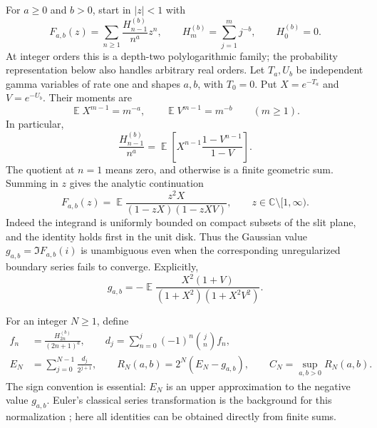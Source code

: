 \documentclass[11pt]{article}
\numberwithin{equation}{section}
\theoremstyle{definition}
\theoremstyle{remark}
\DeclareMathOperator{\E}{\mathbb E}
\begin{document}
For $a\geq0$ and $b>0$, start in $|z|<1$ with
\begin{equation}\label{eq:polylog-definition}
 F_{a,b}(z)=\sum_{n\geq1}\frac{H_{n-1}^{(b)}}{n^a}z^n,
 \qquad H_m^{(b)}=\sum_{j=1}^m j^{-b},\qquad H_0^{(b)}=0.
\end{equation}
At integer orders this is a depth-two polylogarithmic family; the
probability representation below also handles arbitrary real orders.
Let $T_a,U_b$ be independent gamma variables of rate one and shapes
$a,b$, with $T_0=0$. Put $X=e^{-T_a}$ and $V=e^{-U_b}$. Their moments are
\[
 \E X^{m-1}=m^{-a},\qquad \E V^{m-1}=m^{-b}\qquad(m\geq1).
\]
In particular,
\begin{equation}\label{eq:moment-law}
 \frac{H_{n-1}^{(b)}}{n^a}
    =\E\left[X^{n-1}\frac{1-V^{n-1}}{1-V}\right].
\end{equation}
The quotient at $n=1$ means zero, and otherwise is a finite geometric
sum. Summing in $z$ gives the analytic continuation
\begin{equation}\label{eq:polylog-continuation}
 F_{a,b}(z)=\E\frac{z^2X}{(1-zX)(1-zXV)},
 \qquad z\in\mathbb C\setminus[1,\infty).
\end{equation}
Indeed the integrand is uniformly bounded on compact subsets of the
slit plane, and the identity holds first in the unit disk. Thus the
Gaussian value $g_{a,b}=\Im F_{a,b}(i)$ is unambiguous even when the
corresponding unregularized boundary series fails to converge. Explicitly,
\begin{equation}\label{eq:gaussian-value}
 g_{a,b}=-\E\frac{X^2(1+V)}{(1+X^2)(1+X^2V^2)}.
\end{equation}

For an integer $N\geq1$, define
\begin{align}
 f_n&=\frac{H_{2n}^{(b)}}{(2n+1)^a},\qquad
 d_j=\sum_{n=0}^j(-1)^n\binom jn f_n,
 \label{eq:euler-differences}\\
 E_N&=\sum_{j=0}^{N-1}\frac{d_j}{2^{j+1}},\qquad
 R_N(a,b)=2^N(E_N-g_{a,b}),\qquad
 C_N=\sup_{a,b>0}R_N(a,b).
 \label{eq:euler-normalization}
\end{align}
The sign convention is essential: $E_N$ is an upper approximation to
the negative value $g_{a,b}$. Euler's classical series transformation is
the background for this normalization \cite{DLMFEuler}; here all
identities can be obtained directly from finite sums.
\end{document}
